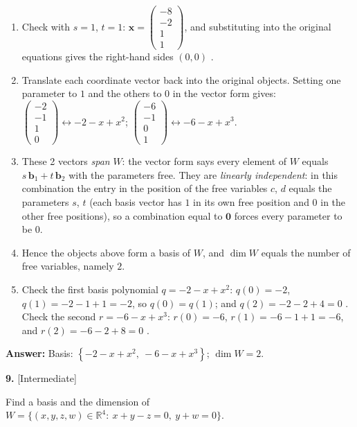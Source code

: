 \documentclass[11pt]{article}
\begin{document}
\begin{tcolorbox}[breakable,colback=ans,colframe=ansb,boxrule=0.5pt,left=4pt,right=4pt,top=2pt,bottom=2pt]
\begin{enumerate}[leftmargin=3.1em,itemsep=1pt,topsep=1pt,label=\textbf{Step \arabic*.}]
\item Check with $s=1$, $t=1$: $\mathbf x=\begin{pmatrix}-8\\-2\\1\\1\end{pmatrix}$, and substituting into the original equations gives the right-hand sides $(0,0)$ \checkmark.
\item Translate each coordinate vector back into the original objects. Setting one parameter to $1$ and the others to $0$ in the vector form gives: $\begin{pmatrix}-2\\-1\\1\\0\end{pmatrix}\leftrightarrow -2-x+x^{2}$; $\begin{pmatrix}-6\\-1\\0\\1\end{pmatrix}\leftrightarrow -6-x+x^{3}$.
\item These 2 vectors \emph{span} $W$: the vector form says every element of $W$ equals $s\,\mathbf b_1+t\,\mathbf b_2$ with the parameters free. They are \emph{linearly independent}: in this combination the entry in the position of the free variables $c$, $d$ equals the parameters $s$, $t$ (each basis vector has $1$ in its own free position and $0$ in the other free positions), so a combination equal to $\mathbf 0$ forces every parameter to be $0$.
\item Hence the objects above form a basis of $W$, and $\dim W$ equals the number of free variables, namely $2$.
\item Check the first basis polynomial $q=-2-x+x^{2}$: $q(0)=-2$, $q(1)=-2-1+1=-2$, so $q(0)=q(1)$; and $q(2)=-2-2+4=0$ \checkmark. Check the second $r=-6-x+x^{3}$: $r(0)=-6$, $r(1)=-6-1+1=-6$, and $r(2)=-6-2+8=0$ \checkmark.
\end{enumerate}\textbf{Answer:} Basis: $\left\{-2-x+x^{2},\ -6-x+x^{3}\right\}$; $\dim W=2$.\end{tcolorbox}
\par\vspace{2pt}
\begin{minipage}{\linewidth}\textbf{9.} \hfill{\scriptsize\color{ink}[Intermediate]}\par\nopagebreak Find a basis and the dimension of $W=\{(x,y,z,w)\in\mathbb{R}^{4}:\ x+y-z=0,\ y+w=0\}$.
\end{minipage}\par\nopagebreak
\end{document}
